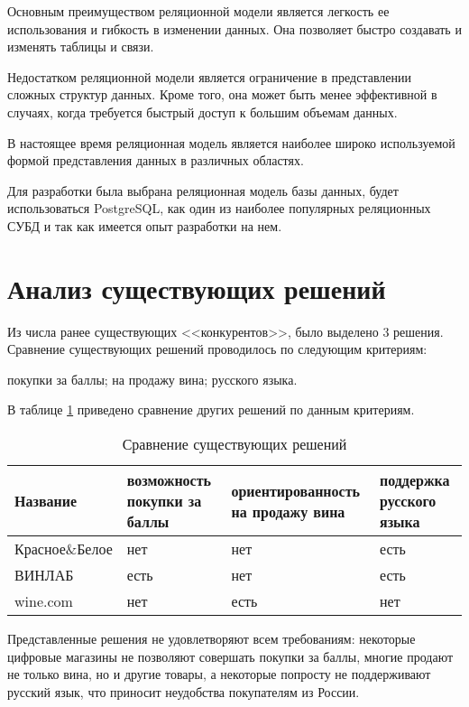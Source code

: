 Основным преимуществом реляционной модели является легкость ее использования и гибкость в изменении данных. Она позволяет быстро создавать и изменять таблицы и связи. 

Недостатком реляционной модели является ограничение в представлении сложных структур данных. Кроме того, она может быть менее эффективной в случаях, когда требуется быстрый доступ к большим объемам данных.

В настоящее время реляционная модель является наиболее широко используемой
формой представления данных в различных областях.

Для разработки была выбрана реляционная модель базы данных,
будет использоваться PostgreSQL, как один из наиболее популярных реляционных СУБД и так как имеется опыт разработки на нем.


\section{Анализ существующих решений}

Из числа ранее существующих <<конкурентов>>, было выделено 3 решения. Сравнение существующих решений проводилось по следующим критериям:
\begin{enumerate}[label=\arabic*)]
 покупки за баллы;
 на продажу вина;
 русского языка.
\end{enumerate}

В таблице \ref{table:change} приведено сравнение других решений по данным критериям.
\newpage
\begin{table}[H]
	\begin{center}
		\caption{Сравнение существующих решений}
		\label{table:change}
  \begin{tabular}{ | p{4cm} | p{3cm} | p{4cm} | p{3cm}|}
    \hline
    {Название}&{возможность покупки за баллы}&{ориентированность на продажу вина}&{поддержка русского языка}\\ \hline
   
    {Красное\&Белое\cite{cb}}&{нет}&{нет}&{есть}
			\\ \hline

    {ВИНЛАБ\cite{winlab}}&{есть}&{нет}&{есть}
			\\ \hline

   {wine.com\cite{wine}}&{нет}&{есть}&{нет}
			\\ \hline
  \end{tabular}
\end{center}
\end{table}

Представленные решения не удовлетворяют всем требованиям: некоторые цифровые магазины не позволяют совершать покупки за баллы, многие продают не только вина, но и другие товары, а некоторые попросту не поддерживают русский язык, что приносит неудобства покупателям из России.


